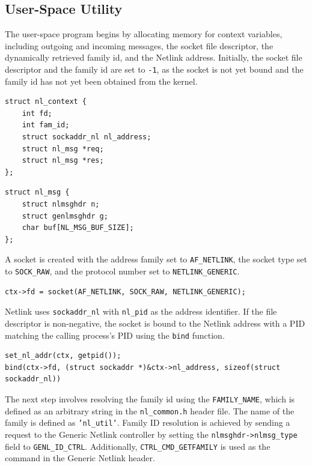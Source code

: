 \documentclass[10pt, letterpaper]{article}
\begin{document}
\subsection{User-Space Utility}
The user-space program begins by allocating memory for context variables, including
outgoing and incoming messages, the socket file descriptor, the dynamically retrieved
family id, and the Netlink address. Initially, the socket file descriptor and the family
id are set to \texttt{-1}, as the socket is not yet bound and the family id has not yet
been obtained from the kernel.

\begin{lstlisting}[caption={Netlink context}]
struct nl_context {
    int fd;
    int fam_id;
    struct sockaddr_nl nl_address;
    struct nl_msg *req;
    struct nl_msg *res;
};
\end{lstlisting}

\begin{lstlisting}[caption={Netlink message structure}]
struct nl_msg {
    struct nlmsghdr n;
    struct genlmsghdr g;
    char buf[NL_MSG_BUF_SIZE];
};
\end{lstlisting}

A socket is created with the address family set to \texttt{AF\_NETLINK}, the socket type
set to \texttt{SOCK\_RAW}, and the protocol number set to \texttt{NETLINK\_GENERIC}.

\begin{lstlisting}[caption={Socket creation}]
ctx->fd = socket(AF_NETLINK, SOCK_RAW, NETLINK_GENERIC);
\end{lstlisting}

Netlink uses \texttt{sockaddr\_nl} with \texttt{nl\_pid} as the address identifier. If the file
descriptor is non-negative, the socket is bound to the Netlink address with a PID matching
the calling process's PID using the \texttt{bind} function.

\begin{lstlisting}[caption={Socket binding}]
set_nl_addr(ctx, getpid());
bind(ctx->fd, (struct sockaddr *)&ctx->nl_address, sizeof(struct sockaddr_nl))
\end{lstlisting}

The next step involves resolving the family id using the \texttt{FAMILY\_NAME}, which is
defined as an arbitrary string in the \texttt{nl\_common.h} header file. The name of the
family is defined as \texttt{'nl\_util'}. Family ID resolution is achieved by sending a
request to the Generic Netlink controller by setting the \texttt{nlmsghdr->nlmsg\_type}
field to \texttt{GENL\_ID\_CTRL}. Additionally, \texttt{CTRL\_CMD\_GETFAMILY} is used as
the command in the Generic Netlink header.
\end{document}
